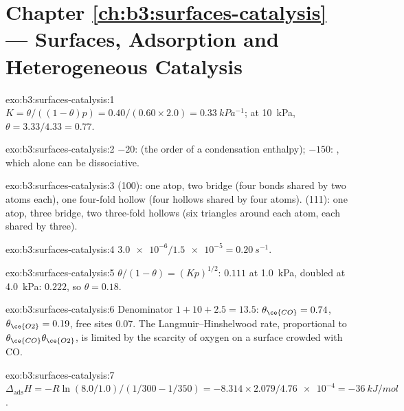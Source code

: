 \section*{Chapter \ref{ch:b3:surfaces-catalysis} --- Surfaces, Adsorption and Heterogeneous Catalysis}

\begin{solution}{exo:b3:surfaces-catalysis:1}
$K = \theta/((1 - \theta)p) = 0.40/(0.60 \times 2.0) = \qty{0.33}{kPa^{-1}}$; at \qty{10}{kPa}, $\theta = 3.33/4.33 = 0.77$.
\end{solution}

\begin{solution}{exo:b3:surfaces-catalysis:2}
$-20$:  (the order of a condensation enthalpy); $-150$: , which
alone can be dissociative.
\end{solution}

\begin{solution}{exo:b3:surfaces-catalysis:3}
(100): one atop, two bridge (four bonds shared by two atoms each), one four-fold
hollow (four hollows shared by four atoms). (111): one atop, three bridge, two
three-fold hollows (six triangles around each atom, each shared by three).
\end{solution}

\begin{solution}{exo:b3:surfaces-catalysis:4}
$\num{3.0e-6}/\num{1.5e-5} = \qty{0.20}{s^{-1}}$.
\end{solution}

\begin{solution}{exo:b3:surfaces-catalysis:5}
$\theta/(1 - \theta) = (Kp)^{1/2}$: $0.111$ at \qty{1.0}{kPa}, doubled at \qty{4.0}{kPa}: $0.222$, so $\theta = 0.18$.
\end{solution}

\begin{solution}{exo:b3:surfaces-catalysis:6}
Denominator $1 + 10 + 2.5 = 13.5$: $\theta_{\ce{CO}} = 0.74$, $\theta_{\ce{O2}} = 0.19$, free sites 0.07. The
Langmuir--Hinshelwood rate, proportional to $\theta_{\ce{CO}}\theta_{\ce{O2}}$, is limited by the
scarcity of oxygen on a surface crowded with CO.
\end{solution}

\begin{solution}{exo:b3:surfaces-catalysis:7}
$\Delta_{\mathrm{ads}}H = -R\ln(8.0/1.0)/(1/300 - 1/350) = -8.314 \times 2.079/\num{4.76e-4} = \qty{-36}{kJ/mol}$.
\end{solution}

